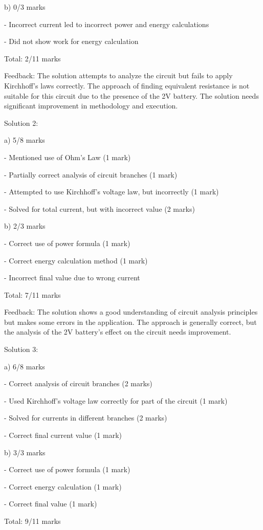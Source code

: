 \documentclass[a4paper,11pt]{article}
\begin{document}
b) 0/3 marks

- Incorrect current led to incorrect power and energy calculations

- Did not show work for energy calculation

Total: 2/11 marks

Feedback: The solution attempts to analyze the circuit but fails to apply Kirchhoff's laws correctly. The approach of finding equivalent resistance is not suitable for this circuit due to the presence of the 2V battery. The solution needs significant improvement in methodology and execution.

Solution 2:

a) 5/8 marks

- Mentioned use of Ohm's Law (1 mark)

- Partially correct analysis of circuit branches (1 mark)

- Attempted to use Kirchhoff's voltage law, but incorrectly (1 mark)

- Solved for total current, but with incorrect value (2 marks)

b) 2/3 marks

- Correct use of power formula (1 mark)

- Correct energy calculation method (1 mark)

- Incorrect final value due to wrong current

Total: 7/11 marks

Feedback: The solution shows a good understanding of circuit analysis principles but makes some errors in the application. The approach is generally correct, but the analysis of the 2V battery's effect on the circuit needs improvement.

Solution 3:

a) 6/8 marks

- Correct analysis of circuit branches (2 marks)

- Used Kirchhoff's voltage law correctly for part of the circuit (1 mark)

- Solved for currents in different branches (2 marks)

- Correct final current value (1 mark)

b) 3/3 marks

- Correct use of power formula (1 mark)

- Correct energy calculation (1 mark)

- Correct final value (1 mark)

Total: 9/11 marks
\end{document}
